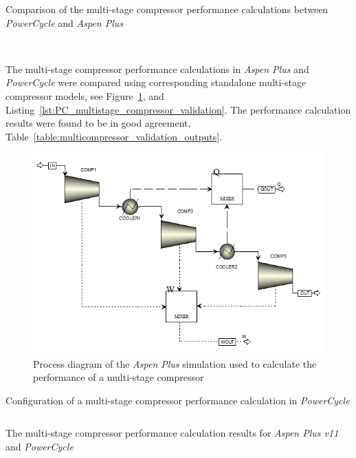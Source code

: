     \begin{table}[H]
        \caption{Comparison of the multi-stage compressor performance calculations between \emph{PowerCycle} and \emph{Aspen Plus}}
        \centering 
        \label{table:multicompressor_validation_inputs}
        
        \\[10pt]
    \end{table}
    
    The multi-stage compressor performance calculations in \emph{Aspen Plus} and \emph{PowerCycle} were compared using corresponding standalone multi-stage compressor models, see Figure~\ref{fig:Aspen_multicomp_validation}, and Listing~\ref{lst:PC_multistage_compressor_validation}. The performance calculation results were found to be in good agreement, Table~\ref{table:multicompressor_validation_outputs}.

    \begin{figure}[H]
        \centering
        \includegraphics{Content/Appendices/Appendix_F/Figures/AspenPLus_MultiStageCompValidation.png}
        \caption{Process diagram of the \emph{Aspen Plus} simulation used to calculate the performance of a multi-stage compressor}
        \label{fig:Aspen_multicomp_validation}
    \end{figure}

    \begin{listing}[H]
        \caption{Configuration of a multi-stage compressor performance calculation in \emph{PowerCycle}}
        \inputminted[bgcolor=bg,linenos, fontsize=\footnotesize]{python}{Content/Appendices/Appendix_F/Code/MultiStageCompressorPerf_snippet.py}
        \label{lst:PC_multistage_compressor_validation}
        \vspace{-20pt}
    \end{listing}

    \begin{table}[H]
        \caption{The multi-stage compressor performance calculation results for \emph{Aspen Plus v11} and \emph{PowerCycle}}
        \centering 
        \label{table:multicompressor_validation_outputs}
        
        \\[10pt]
    \end{table}
